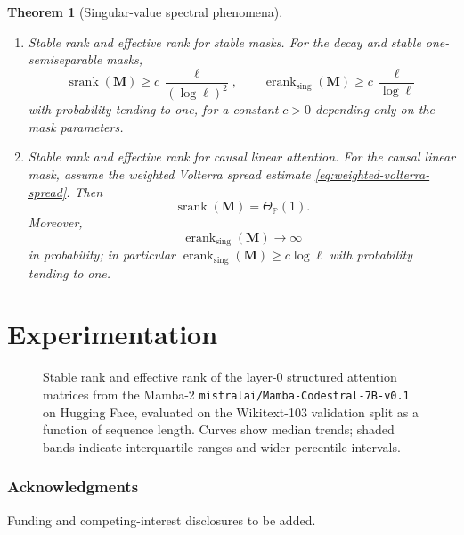 \documentclass{article}
\newcommand{\Prob}{\mathbb{P}}
\newcommand{\srank}{\operatorname{srank}}
\newcommand{\erank}{\operatorname{erank}}
\newcommand{\bM}{\mathbf{M}}
\newtheorem{theorem}{Theorem}
\theoremstyle{remark}
\begin{document}
\begin{theorem}[Singular-value spectral phenomena]
\begin{enumerate}
\item[(ii)] Stable rank and effective rank for stable masks.  For the decay and
stable one-semiseparable masks,
\begin{equation}
    \srank(\bM)
    \geq
    c\,\frac{\ell}{(\log\ell)^2},
    \qquad
    \erank_{\mathrm{sing}}(\bM)
    \geq
    c\,\frac{\ell}{\log\ell}
    \label{eq:stable-mask-singular-ranks}
\end{equation}
with probability tending to one, for a constant $c>0$ depending only on the
mask parameters.

\item[(iii)] Stable rank and effective rank for causal linear attention.  For
the causal linear mask, assume the weighted Volterra spread estimate
\eqref{eq:weighted-volterra-spread}.  Then
\[
    \srank(\bM)=\Theta_{\Prob}(1).
\]
Moreover,
\begin{equation}
    \erank_{\mathrm{sing}}(\bM)\longrightarrow\infty
    \label{eq:linear-mask-singular-ranks}
\end{equation}
in probability; in particular
$\erank_{\mathrm{sing}}(\bM)\geq c\log\ell$ with probability tending to one.
\end{enumerate}
\label{thm:singular-spectral-phenomena}
\end{theorem}

\section{Experimentation}

\begin{figure}[t]
  \centering
  
  \caption{Stable rank and effective rank of the layer-0 structured attention
  matrices from the Mamba-2 
  \texttt{mistralai/Mamba-Codestral-7B-v0.1} on Hugging Face, evaluated on the
  Wikitext-103 validation split as a function of sequence length.  Curves show
  median trends; shaded bands indicate interquartile ranges and wider
  percentile intervals.}
  \label{fig:rank-wikitext}
\end{figure}

\subsubsection*{Acknowledgments}
Funding and competing-interest disclosures to be added.




\appendix
\end{document}
